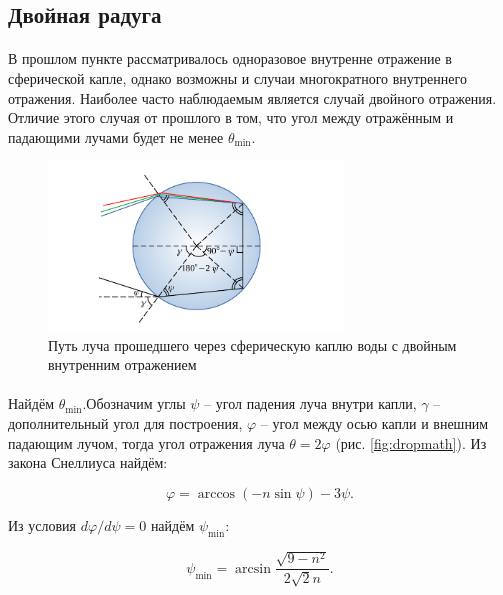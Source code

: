 \documentclass[a4paper,12pt]{article} %
\begin{document}
\subsection{Двойная радуга}

\paragraph{} В прошлом пункте рассматривалось одноразовое внутренне отражение в сферической капле, однако возможны и случаи многократного внутреннего отражения. Наиболее часто наблюдаемым является случай двойного отражения. Отличие этого случая от прошлого в том, что угол между отражённым и падающими лучами будет не менее $\theta_{\min}$.

\begin{figure}[h]
\centering
\includegraphics[width=0.7\textwidth]{dropmath2.pdf}
\caption{\centering Путь луча прошедшего через сферическую каплю воды с двойным внутренним отражением}
\label{fig:dropmath2}
\end{figure}

\paragraph{} Найдём $\theta_{\min}$.Обозначим углы $\psi$ -- угол падения луча внутри капли, $\gamma$ -- дополнительный угол для построения, $\varphi$ -- угол между осью капли и внешним падающим лучом, тогда угол отражения луча $\theta = 2 \varphi$ (рис. \ref{fig:dropmath}). Из закона Снеллиуса найдём:

\begin{equation}
\varphi = \arccos(-n \sin{\psi}) - 3 \psi.
\label{e:snell2}
\end{equation}

\noindent Из условия $d\varphi / d\psi = 0$ найдём $\psi_{\min}$:

\begin{equation}
\psi_{\min} = \arcsin{\frac{\sqrt{9 - n^2}}{2\sqrt{2} n}}.
\label{e:psimin}
\end{equation}
\end{document}
